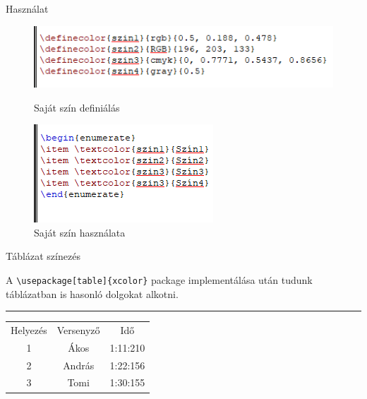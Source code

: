 \documentclass[aspectratio=1610,dvipsnames,xcolor=table]{beamer}
\begin{document}
\begin{frame}[fragile]{Használat}

\begin{figure}[H]
\includegraphics[scale=0.9]{img/itemszinezes2.1.png} 
\caption{Saját szín definiálás}
\includegraphics[scale=0.9]{img/itemszinezes2.png}
\caption{Saját szín használata}
\end{figure}
\end{frame}

\begin{frame}[fragile]{Táblázat színezés}
\begin{center}

A \verb!\usepackage[table]{xcolor}! package implementálása után tudunk táblázatban is hasonló dolgokat alkotni.
\noindent
{\color{Dandelion} \rule{\linewidth}{1mm}}
\end{center}

\vfill
\begin{center}
  \begin{tabular}{|c|c|c|}
     \hline
    \rowcolor{Apricot}Helyezés & Versenyző & Idő \\
    \cellcolor{ForestGreen}1 & \cellcolor{Orchid}Ákos & \cellcolor{Aquamarine}1:11:210 \\
    \cellcolor{Yellow}2  & \cellcolor{Mulberry}András & \cellcolor{Emerald}1:22:156  \\
    \cellcolor{BurntOrange}3 & \cellcolor{Plum}Tomi  &  \cellcolor{PineGreen}1:30:155 \\
    \hline
    \end{tabular}
\end{center}
\end{frame}
\end{document}
